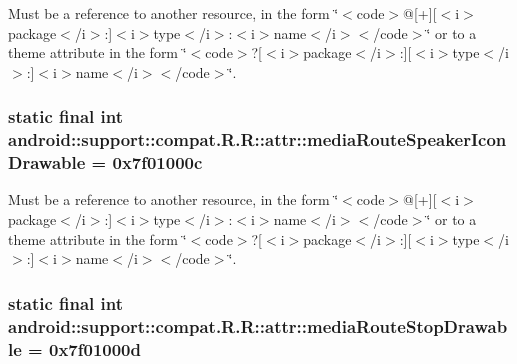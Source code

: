 Must be a reference to another resource, in the form \char`\"{}$<$code$>$@\mbox{[}+\mbox{]}\mbox{[}$<$i$>$package$<$/i$>$:\mbox{]}$<$i$>$type$<$/i$>$:$<$i$>$name$<$/i$>$$<$/code$>$\char`\"{} or to a theme attribute in the form \char`\"{}$<$code$>$?\mbox{[}$<$i$>$package$<$/i$>$:\mbox{]}\mbox{[}$<$i$>$type$<$/i$>$:\mbox{]}$<$i$>$name$<$/i$>$$<$/code$>$\char`\"{}. \hypertarget{classandroid_1_1support_1_1compat_1_1_r_1_1attr_f0f0dc724be8f240a9bd655f159e4659}{
\subsubsection[{mediaRouteSpeakerIconDrawable}]{\setlength{\rightskip}{0pt plus 5cm}static final int android::support::compat.R.R::attr::mediaRouteSpeakerIconDrawable = 0x7f01000c}}
\label{classandroid_1_1support_1_1compat_1_1_r_1_1attr_f0f0dc724be8f240a9bd655f159e4659}


Must be a reference to another resource, in the form \char`\"{}$<$code$>$@\mbox{[}+\mbox{]}\mbox{[}$<$i$>$package$<$/i$>$:\mbox{]}$<$i$>$type$<$/i$>$:$<$i$>$name$<$/i$>$$<$/code$>$\char`\"{} or to a theme attribute in the form \char`\"{}$<$code$>$?\mbox{[}$<$i$>$package$<$/i$>$:\mbox{]}\mbox{[}$<$i$>$type$<$/i$>$:\mbox{]}$<$i$>$name$<$/i$>$$<$/code$>$\char`\"{}. \hypertarget{classandroid_1_1support_1_1compat_1_1_r_1_1attr_9927c397e7ba5219e3de79cac6f26ed3}{
\subsubsection[{mediaRouteStopDrawable}]{\setlength{\rightskip}{0pt plus 5cm}static final int android::support::compat.R.R::attr::mediaRouteStopDrawable = 0x7f01000d}}
\label{classandroid_1_1support_1_1compat_1_1_r_1_1attr_9927c397e7ba5219e3de79cac6f26ed3}


